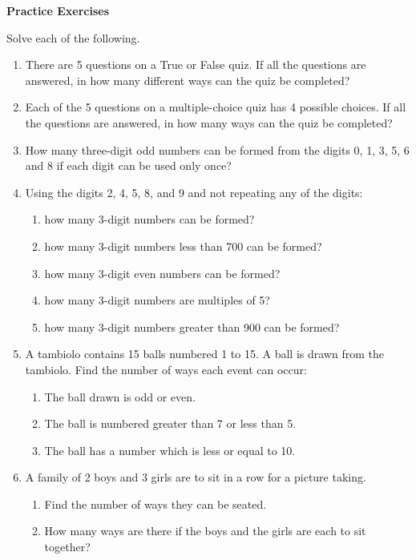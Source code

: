 \textbf{Practice Exercises}

\vspce

Solve each of the following.
{\begin{enumerate}[label = \arabic*. ]
\item There are 5 questions on a True or False quiz. If all the questions are answered, in how many different ways can the quiz be completed?
\item Each of the 5 questions on a multiple-choice quiz has 4 possible choices. If all the questions are answered, in how many ways can the quiz be completed?
\item How many three-digit odd numbers can be formed from the digits 0, 1, 3, 5, 6 and 8 if each digit can be used only once?
\item Using the digits 2, 4, 5, 8, and 9 and not repeating any of the digits: 
\begin{enumerate}[label = \arabic*. ]
\item how many 3-digit numbers can be formed?
\item how many 3-digit numbers less than 700 can be formed?
\item how many 3-digit even numbers can be formed?
\item how many 3-digit numbers are multiples of 5?
\item how many 3-digit numbers greater than 900 can be formed? 
\end{enumerate} 
\item A tambiolo contains 15 balls numbered 1 to 15. A ball is drawn from the tambiolo. Find the number of ways each event can occur:
\begin{enumerate}[label = \alph*. ]
\item The ball drawn is odd or even. 
\item The ball is numbered greater than 7 or less than 5.
\item The ball has a number which is less or equal to 10.
\end{enumerate} 
\item A family of 2 boys and 3 girls are to sit in a row for a picture taking.
\begin{enumerate}[label = \alph*. ]
\item Find the number of ways they can be seated.
\item How many ways are there if the boys and the girls are each to sit together? 
\end{enumerate} 

\end{enumerate}}



